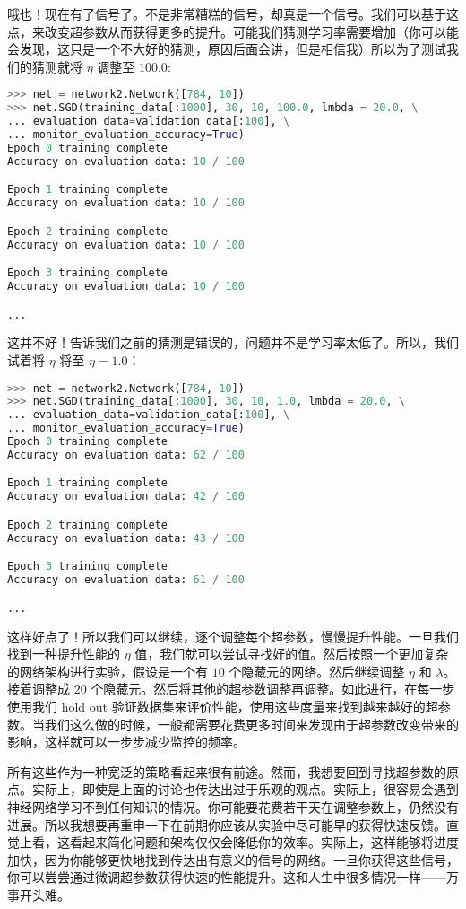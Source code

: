 哦也！现在有了信号了。不是非常糟糕的信号，却真是一个信号。我们可以基于这点，来改变超参数从而获得更多的提升。可能我们猜测学习率需要增加（你可以能会发现，这只是一个不大好的猜测，原因后面会讲，但是相信我）所以为了测试我们的猜测就将 $\eta$ 调整至 $100.0$:
\begin{lstlisting}[language=Python]
>>> net = network2.Network([784, 10])
>>> net.SGD(training_data[:1000], 30, 10, 100.0, lmbda = 20.0, \
... evaluation_data=validation_data[:100], \
... monitor_evaluation_accuracy=True)
Epoch 0 training complete
Accuracy on evaluation data: 10 / 100

Epoch 1 training complete
Accuracy on evaluation data: 10 / 100

Epoch 2 training complete
Accuracy on evaluation data: 10 / 100

Epoch 3 training complete
Accuracy on evaluation data: 10 / 100

...
\end{lstlisting}

这并不好！告诉我们之前的猜测是错误的，问题并不是学习率太低了。所以，我们试着将 $\eta$ 将至 $\eta=1.0$：
\begin{lstlisting}[language=Python]
>>> net = network2.Network([784, 10])
>>> net.SGD(training_data[:1000], 30, 10, 1.0, lmbda = 20.0, \
... evaluation_data=validation_data[:100], \
... monitor_evaluation_accuracy=True)
Epoch 0 training complete
Accuracy on evaluation data: 62 / 100

Epoch 1 training complete
Accuracy on evaluation data: 42 / 100

Epoch 2 training complete
Accuracy on evaluation data: 43 / 100

Epoch 3 training complete
Accuracy on evaluation data: 61 / 100

...
\end{lstlisting}

这样好点了！所以我们可以继续，逐个调整每个超参数，慢慢提升性能。一旦我们找到一种提升性能的 $\eta$ 值，我们就可以尝试寻找好的值。然后按照一个更加复杂的网络架构进行实验，假设是一个有 $10$ 个隐藏元的网络。然后继续调整 $\eta$ 和 $\lambda$。接着调整成 $20$ 个隐藏元。然后将其他的超参数调整再调整。如此进行，在每一步使用我们 hold out 验证数据集来评价性能，使用这些度量来找到越来越好的超参数。当我们这么做的时候，一般都需要花费更多时间来发现由于超参数改变带来的影响，这样就可以一步步减少监控的频率。

所有这些作为一种宽泛的策略看起来很有前途。然而，我想要回到寻找超参数的原点。实际上，即使是上面的讨论也传达出过于乐观的观点。实际上，很容易会遇到神经网络学习不到任何知识的情况。你可能要花费若干天在调整参数上，仍然没有进展。所以我想要再重申一下在前期你应该从实验中尽可能早的获得快速反馈。直觉上看，这看起来简化问题和架构仅仅会降低你的效率。实际上，这样能够将进度加快，因为你能够更快地找到传达出有意义的信号的网络。一旦你获得这些信号，你可以尝尝通过微调超参数获得快速的性能提升。这和人生中很多情况一样——万事开头难。

